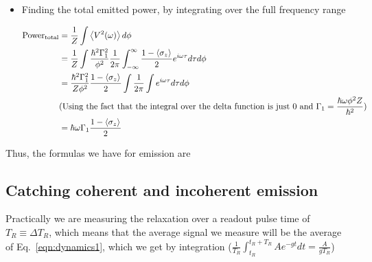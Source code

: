 \begin{itemize}
\item Finding the total  emitted power, by integrating over the  full frequency range 
  
  \begin{equation}\label{feb220183}
    \begin{aligned}
      \text{Power}_\text{total} &= \frac{1}{Z}\int 	\left\langle V^2(\omega) \right\rangle  d\phi\\
      & = \frac{1}{Z}\int \frac{\hbar^2\Gamma_1^{2}}{\phi^2}\frac{1}{2\pi}\int_{-\infty}^{\infty} \frac{1-{{\left\langle \sigma_z \right\rangle} }_{}}{2} e^{i\omega \tau}d\tau   d\phi\\
      & = \frac{\hbar^2\Gamma_1^2}{Z\phi^2} \frac{1-{{\left\langle \sigma_z \right\rangle} }_{}}{2} \int\frac{1}{2\pi}\int e^{i\omega\tau}d\tau d\phi\\
      & \text{(Using the fact that the integral over the delta function is just 0 and } \Gamma_1 = \frac{\hbar\omega\phi^2Z}{\hbar^2})\\
      & = \hbar\omega\Gamma_1 \frac{1-{{\left\langle \sigma_z \right\rangle} }_{}}{2}
    \end{aligned}
  \end{equation}
\end{itemize}

Thus, the formulas we have for emission are 
  
  \subsection{Catching coherent and incoherent emission}
  Practically   we   are  measuring   the   relaxation   over   a   readout  pulse   time   of
  $ T_R  \equiv \Delta  T_R $,  which means  that the average  signal we  measure will  be the
  average     of     Eq.~\eqref{eqn:dynamics1},     which    we     get     by     integration
  ($ \frac{1}{T_R}\int_{t_R}^{t_R+T_R}Ae^{-gt}dt = \frac{A}{gT_R} $)
  
